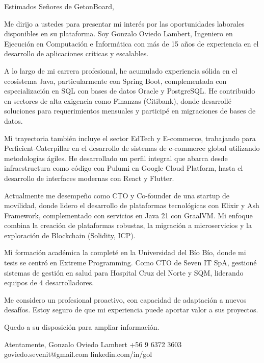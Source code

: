 Estimados Señores de GetonBoard,

Me dirijo a ustedes para presentar mi interés por las oportunidades laborales disponibles en su plataforma. Soy Gonzalo Oviedo Lambert, Ingeniero en Ejecución en Computación e Informática con más de 15 años de experiencia en el desarrollo de aplicaciones críticas y escalables.

A lo largo de mi carrera profesional, he acumulado experiencia sólida en el ecosistema Java, particularmente con Spring Boot, complementada con especialización en SQL con bases de datos Oracle y PostgreSQL. He contribuido en sectores de alta exigencia como Finanzas (Citibank), donde desarrollé soluciones para requerimientos mensuales y participé en migraciones de bases de datos.

Mi trayectoria también incluye el sector EdTech y E-commerce, trabajando para Perficient-Caterpillar en el desarrollo de sistemas de e-commerce global utilizando metodologías ágiles. He desarrollado un perfil integral que abarca desde infraestructura como código con Pulumi en Google Cloud Platform, hasta el desarrollo de interfaces modernas con React y Flutter.

Actualmente me desempeño como CTO y Co-founder de una startup de movilidad, donde lidero el desarrollo de plataformas tecnológicas con Elixir y Ash Framework, complementado con servicios en Java 21 con GraalVM. Mi enfoque combina la creación de plataformas robustas, la migración a microservicios y la exploración de Blockchain (Solidity, ICP).

Mi formación académica la completé en la Universidad del Bío Bío, donde mi tesis se centró en Extreme Programming. Como CTO de Seven IT SpA, gestioné sistemas de gestión en salud para Hospital Cruz del Norte y SQM, liderando equipos de 4 desarrolladores.

Me considero un profesional proactivo, con capacidad de adaptación a nuevos desafíos. Estoy seguro de que mi experiencia puede aportar valor a sus proyectos.

Quedo a su disposición para ampliar información.

Atentamente,
Gonzalo Oviedo Lambert
+56 9 6372 3603
goviedo.sevenit@gmail.com
linkedin.com/in/gol
